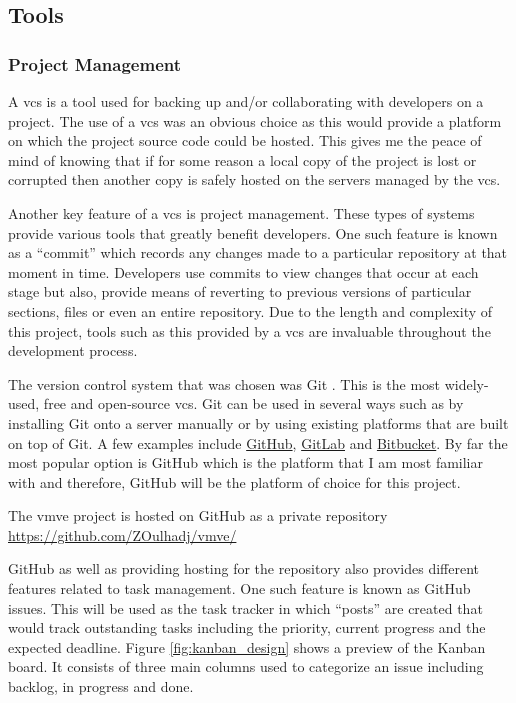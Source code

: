 \documentclass[11pt]{article}
\begin{document}
\subsection{Tools}
\subsubsection{Project Management}
A \gls{vcs} is a tool used for backing up and/or collaborating with developers
on a project. The use of a \gls{vcs} was an obvious choice as this would provide
a platform on which the project source code could be hosted. This gives me the
peace of mind of knowing that if for some reason a local copy of the project is
lost or corrupted then another copy is safely hosted on the servers managed by
the \gls{vcs}.

Another key feature of a \gls{vcs} is project management. These types of systems
provide various tools that greatly benefit developers. One such feature is known
as a ``commit'' which records any changes made to a particular repository at
that moment in time. Developers use commits to view changes that occur at each
stage but also, provide means of reverting to previous versions of particular
sections, files or even an entire repository. Due to the length and complexity
of this project, tools such as this provided by a \gls{vcs} are invaluable
throughout the development process.

The version control system that was chosen was Git \cite{gitvcs}. This is the
most widely-used, free and open-source \gls{vcs}. Git can be used in several
ways such as by installing Git onto a server manually or by using existing
platforms that are built on top of Git. A few examples include
\href{http://github.com}{GitHub}, \href{http://gitlab.com}{GitLab} and
\href{https://bitbucket.org/}{Bitbucket}. By far the most popular option is
GitHub which is the platform that I am most familiar with and therefore, GitHub
will be the platform of choice for this project.


The \gls{vmve} project is hosted on GitHub as a private repository
\url{https://github.com/ZOulhadj/vmve/}


GitHub as well as providing hosting for the repository also provides different
features related to task management. One such feature is known as GitHub issues.
This will be used as the task tracker in which ``posts'' are created that would
track outstanding tasks including the priority, current progress and the
expected deadline. Figure \ref{fig:kanban_design} shows a preview of the Kanban
board. It consists of three main columns used to categorize an issue including
backlog, in progress and done. 
\end{document}
